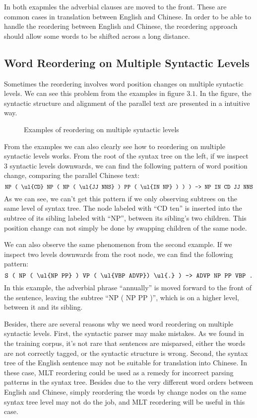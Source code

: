 In both exapmles the adverbial clauses are moved to the front. These are common cases in translation between English and Chinese. In order to be able to handle the reordering between English and Chinese, the reordering approach should allow some words to be shifted across a long distance.

\subsection{Word Reordering on Multiple Syntactic Levels}

Sometimes the reordering involves word position changes on multiple syntactic levels. We can see this problem from the examples in figure $3.1$. In the figure, the syntactic structure and alignment of the parallel text are presented in a intuitive way.

\begin{figure}[H]
\centering
\subfigure {

}
\subfigure {

}
\caption{Examples of reordering on multiple syntactic levels}
\end{figure}

From the examples we can also clearly see how to reordering on multiple syntactic levels works. From the root of the syntax tree on the left, if we inspect 3 syntactic levels downwards, we can find the following pattern of word position change, comparing the parallel Chinese text:
$$\texttt{NP ( \ul{CD} NP ( NP ( \ul{JJ NNS} ) PP ( \ul{IN NP} ) ) ) -> NP IN CD JJ NNS}$$
As we can see, we can't get this pattern if we only observing subtrees on the same level of syntax tree. The node labeled with ``CD ten'' is inserted into the subtree of its sibling labeled with ``NP'', between its sibling's two children. This position change can not simply be done by swapping children of the same node.

We can also observe the same phenomenon from the second example. If we inspect two levels downwards from the root node, we can find the following pattern:
$$\texttt{S ( NP ( \ul{NP PP} ) VP ( \ul{VBP ADVP}) \ul{.} ) -> ADVP NP PP VBP .}$$
In this example, the adverbial phrase ``annually'' is moved forward to the front of the sentence, leaving the subtree ``NP ( NP PP )'', which is on a higher level, between it and its sibling.

Besides, there are several reasons why we need word reordering on multiple syntactic levels. First, the syntactic parser may make mistakes. As we found in the training corpus, it's not rare that sentences are misparsed, either the words are not correctly tagged, or the syntactic structure is wrong. Second, the syntax tree of the English sentence may not be suitable for translation into Chinese. In these case, MLT reordering could be used as a remedy for incorrect parsing patterns in the syntax tree. Besides due to the very different word orders between English and Chinese, simply reordering the words by change nodes on the same syntax tree level may not do the job, and MLT reordering will be useful in this case.


